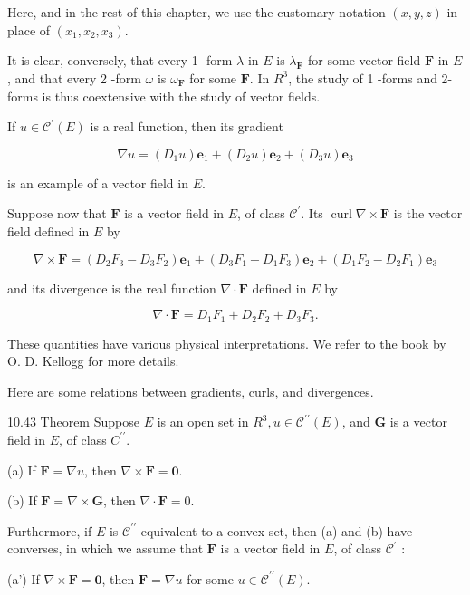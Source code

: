 \documentclass[10pt]{article}
\begin{document}
Here, and in the rest of this chapter, we use the customary notation $(x, y, z)$ in place of $\left(x_{1}, x_{2}, x_{3}\right)$.

It is clear, conversely, that every 1 -form $\lambda$ in $E$ is $\lambda_{\mathbf{F}}$ for some vector field $\mathbf{F}$ in $E$, and that every 2 -form $\omega$ is $\omega_{\mathbf{F}}$ for some $\mathbf{F}$. In $R^{3}$, the study of 1 -forms and 2-forms is thus coextensive with the study of vector fields.

If $u \in \mathscr{C}^{\prime}(E)$ is a real function, then its gradient

$$
\nabla u=\left(D_{1} u\right) \mathbf{e}_{1}+\left(D_{2} u\right) \mathbf{e}_{2}+\left(D_{3} u\right) \mathbf{e}_{3}
$$

is an example of a vector field in $E$.

Suppose now that $\mathbf{F}$ is a vector field in $E$, of class $\mathscr{C}^{\prime}$. Its $\operatorname{curl} \nabla \times \mathbf{F}$ is the vector field defined in $E$ by

$$
\nabla \times \mathbf{F}=\left(D_{2} F_{3}-D_{3} F_{2}\right) \mathbf{e}_{1}+\left(D_{3} F_{1}-D_{1} F_{3}\right) \mathbf{e}_{2}+\left(D_{1} F_{2}-D_{2} F_{1}\right) \mathbf{e}_{3}
$$

and its divergence is the real function $\nabla \cdot \mathbf{F}$ defined in $E$ by

$$
\nabla \cdot \mathbf{F}=D_{1} F_{1}+D_{2} F_{2}+D_{3} F_{3} .
$$

These quantities have various physical interpretations. We refer to the book by O. D. Kellogg for more details.

Here are some relations between gradients, curls, and divergences.

10.43 Theorem Suppose $E$ is an open set in $R^{3}, u \in \mathscr{C}^{\prime \prime}(E)$, and $\mathbf{G}$ is a vector field in $E$, of class $C^{\prime \prime}$.

(a) If $\mathbf{F}=\nabla u$, then $\nabla \times \mathbf{F}=\mathbf{0}$.

(b) If $\mathbf{F}=\nabla \times \mathbf{G}$, then $\nabla \cdot \mathbf{F}=0$.

Furthermore, if $E$ is $\mathscr{C}^{\prime \prime}$-equivalent to a convex set, then (a) and (b) have converses, in which we assume that $\mathbf{F}$ is a vector field in $E$, of class $\mathscr{C}^{\prime}$ :

(a') If $\nabla \times \mathbf{F}=\mathbf{0}$, then $\mathbf{F}=\nabla u$ for some $u \in \mathscr{C}^{\prime \prime}(E)$.
\end{document}
